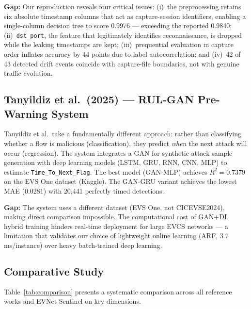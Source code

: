 \documentclass[conference]{IEEEtran}
\newcommand{\col}[1]{\texttt{\small #1}}
\begin{document}
\textbf{Gap:} Our reproduction reveals four critical issues: (i)~the preprocessing retains six absolute timestamp columns that act as capture-session identifiers, enabling a single-column decision tree to score 0.9976 --- exceeding the reported 0.9840; (ii)~\col{dst\_port}, the feature that legitimately identifies reconnaissance, is dropped while the leaking timestamps are kept; (iii)~prequential evaluation in capture order inflates accuracy by 44 points due to label autocorrelation; and (iv)~42 of 43 detected drift events coincide with capture-file boundaries, not with genuine traffic evolution.

\subsection{Tanyildiz et al.\ (2025) --- RUL-GAN Pre-Warning System \cite{b5}}

Tanyildiz et al.\ take a fundamentally different approach: rather than classifying whether a flow is malicious (classification), they predict \emph{when} the next attack will occur (regression). The system integrates a GAN for synthetic attack-sample generation with deep learning models (LSTM, GRU, RNN, CNN, MLP) to estimate \col{Time\_To\_Next\_Flag}. The best model (GAN-MLP) achieves $R^2 = 0.7379$ on the EVS One dataset (Kaggle). The GAN-GRU variant achieves the lowest MAE (0.0281) with 20,441 perfectly timed detections.

\textbf{Gap:} The system uses a different dataset (EVS One, not CICEVSE2024), making direct comparison impossible. The computational cost of GAN+DL hybrid training hinders real-time deployment for large EVCS networks --- a limitation that validates our choice of lightweight online learning (ARF, 3.7\,ms/instance) over heavy batch-trained deep learning.

\subsection{Comparative Study}

Table~\ref{tab:comparison} presents a systematic comparison across all reference works and EVNet Sentinel on key dimensions.
\end{document}
